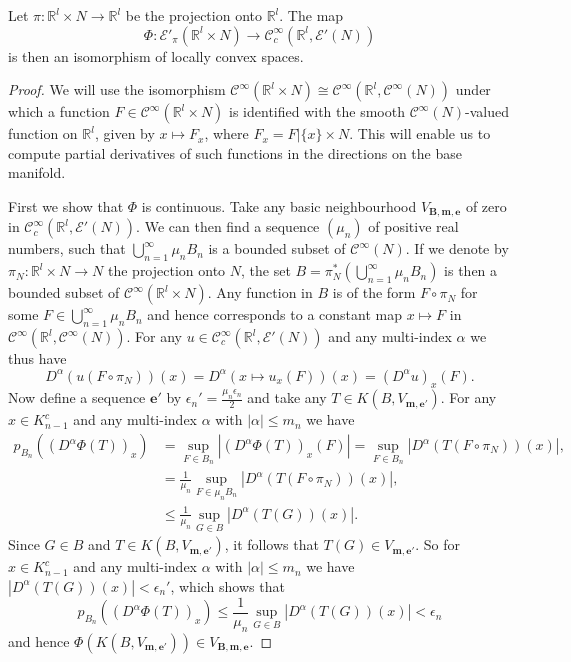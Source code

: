 \documentclass[10pt,a4paper]{amsart}
\newcommand{\Cc}{\mathord{\mathcal{C}^{\infty}_{c}}}
\newcommand{\C}{\mathord{\mathcal{C}^{\infty}}}
\newcommand{\RR}{\mathbb{R}}
\newcommand{\cE}{\mathcal{E}}
\newcommand{\com}{\mathbin{{\scriptstyle \circ }}}
\begin{document}
\begin{prop}
Let $\pi:\RR^{l}\times N\to \RR^{l}$ be the projection onto $\RR^{l}$. The map 
\[
\Phi:\cE'_{\pi}(\RR^{l}\times N)\to\Cc(\RR^{l},\cE'(N))
\]
is then an isomorphism of locally convex spaces.
\end{prop}

\begin{proof}
We will use the isomorphism $\C(\RR^{l}\times N)\cong\C(\RR^{l},\C(N))$ under which
a function $F\in\C(\RR^{l}\times N)$ is identified with the smooth $\C(N)$-valued function on $\RR^{l}$, given by $x\mapsto F_{x}$,
where $F_{x}=F|\{x\}\times N$. This will enable us to compute partial derivatives of such functions in the directions on the base manifold.

First we show that $\Phi$ is continuous. Take any basic neighbourhood $V_{\textbf{B},\textbf{m},\textbf{e}}$ of zero
in $\Cc(\RR^{l},\cE'(N))$. We can then find a sequence $(\mu_{n})$ of positive real numbers, such that $\bigcup_{n=1}^{\infty}\mu_{n}B_{n}$
is a bounded subset of $\C(N)$. If we denote by $\pi_{N}:\RR^{l}\times N\to N$ the projection onto $N$, the set 
$B=\pi_{N}^{*}\left(\bigcup_{n=1}^{\infty}\mu_{n}B_{n}\right)$ is then a bounded subset of $\C(\RR^{l}\times N)$. Any function
in $B$ is of the form $F\com\pi_{N}$ for some $F\in\bigcup_{n=1}^{\infty}\mu_{n}B_{n}$ and hence corresponds to a
constant map $x\mapsto F$ in $\C(\RR^{l},\C(N))$. For any $u\in\Cc(\RR^{l},\cE'(N))$ and any multi-index $\alpha$ we thus have
\[
D^{\alpha}(u(F\com\pi_{N}))(x)=D^{\alpha}(x\mapsto u_{x}(F))(x)=(D^{\alpha}u)_{x}(F).
\]
Now define a sequence $\textbf{e}'$ by $\epsilon_{n}'=\frac{\mu_{n}\epsilon_{n}}{2}$ and take any $T\in K(B,V_{\textbf{m},\textbf{e}'})$.
For any $x\in K_{n-1}^{c}$ and any multi-index $\alpha$ with $|\alpha|\leq m_{n}$ we have
\begin{align*}
p_{B_{n}}((D^{\alpha}\Phi(T))_{x})&=\sup_{F\in B_{n}}|(D^{\alpha}\Phi(T))_{x}(F)|
=\sup_{F\in B_{n}}|D^{\alpha}(T(F\com\pi_{N}))(x)|, \\
&=\frac{1}{\mu_{n}}\sup_{F\in \mu_{n}B_{n}}|D^{\alpha}(T(F\com\pi_{N}))(x)|, \\
&\leq \frac{1}{\mu_{n}}\sup_{G\in B}|D^{\alpha}(T(G))(x)|.
\end{align*}
Since $G\in B$ and $T\in K(B,V_{\textbf{m},\textbf{e}'})$, it follows that $T(G)\in V_{\textbf{m},\textbf{e}'}$. So for 
$x\in K_{n-1}^{c}$ and any multi-index $\alpha$ with $|\alpha|\leq m_{n}$ we have $|D^{\alpha}(T(G))(x)|<\epsilon_{n}'$, which shows that
\[
p_{B_{n}}((D^{\alpha}\Phi(T))_{x})\leq \frac{1}{\mu_{n}}\sup_{G\in B}|D^{\alpha}(T(G))(x)|<\epsilon_{n}
\] 
and hence $\Phi(K(B,V_{\textbf{m},\textbf{e}'}))\in V_{\textbf{B},\textbf{m},\textbf{e}}$.


\end{proof}
\end{document}
